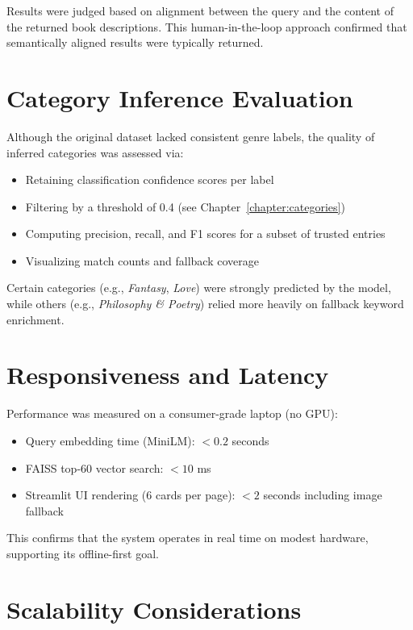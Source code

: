 Results were judged based on alignment between the query and the content of the returned book descriptions. This human-in-the-loop approach confirmed that semantically aligned results were typically returned.

\section{Category Inference Evaluation}
\label{sec:category-eval}

Although the original dataset lacked consistent genre labels, the quality of inferred categories was assessed via:

\begin{itemize}
    \item Retaining classification confidence scores per label
    \item Filtering by a threshold of 0.4 (see Chapter~\ref{chapter:categories})
    \item Computing precision, recall, and F1 scores for a subset of trusted entries
    \item Visualizing match counts and fallback coverage
\end{itemize}

Certain categories (e.g., \textit{Fantasy}, \textit{Love}) were strongly predicted by the model, while others (e.g., \textit{Philosophy \& Poetry}) relied more heavily on fallback keyword enrichment.

\section{Responsiveness and Latency}
\label{sec:latency}

Performance was measured on a consumer-grade laptop (no GPU):

\begin{itemize}
    \item Query embedding time (MiniLM): $< 0.2$ seconds
    \item FAISS top-60 vector search: $< 10$ ms
    \item Streamlit UI rendering (6 cards per page): $< 2$ seconds including image fallback
\end{itemize}

This confirms that the system operates in real time on modest hardware, supporting its offline-first goal.

\section{Scalability Considerations}
\label{sec:scaling}

